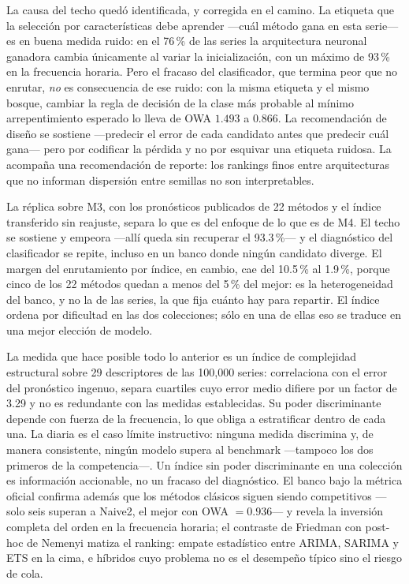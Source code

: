 La causa del techo quedó identificada, y corregida en el camino. La etiqueta que la
selección por características debe aprender ---cuál método gana en esta serie--- es en
buena medida ruido: en el 76\,\% de las series la arquitectura neuronal ganadora cambia
únicamente al variar la inicialización, con un máximo de 93\,\% en la frecuencia horaria.
Pero el fracaso del clasificador, que termina peor que no enrutar, \emph{no} es
consecuencia de ese ruido: con la misma etiqueta y el mismo bosque, cambiar la regla de
decisión de la clase más probable al mínimo arrepentimiento esperado lo lleva de OWA
$1.493$ a $0.866$. La recomendación de diseño se sostiene ---predecir el error de cada
candidato antes que predecir cuál gana--- pero por codificar la pérdida y no por esquivar
una etiqueta ruidosa. La acompaña una recomendación de reporte: los rankings finos entre
arquitecturas que no informan dispersión entre semillas no son interpretables.

La réplica sobre M3, con los pronósticos publicados de 22 métodos y el índice transferido
sin reajuste, separa lo que es del enfoque de lo que es de M4. El techo se sostiene y
empeora ---allí queda sin recuperar el 93.3\,\%--- y el diagnóstico del clasificador se
repite, incluso en un banco donde ningún candidato diverge. El margen del enrutamiento por
índice, en cambio, cae del 10.5\,\% al 1.9\,\%, porque cinco de los 22 métodos quedan a
menos del 5\,\% del mejor: es la heterogeneidad del banco, y no la de las series, la que
fija cuánto hay para repartir. El índice ordena por dificultad en las dos colecciones; sólo
en una de ellas eso se traduce en una mejor elección de modelo.

La medida que hace posible todo lo anterior es un índice de complejidad estructural sobre
29 descriptores de las 100{,}000 series: correlaciona con el error del pronóstico ingenuo,
separa cuartiles cuyo error medio difiere por un factor de 3.29 y no es redundante con las
medidas establecidas. Su poder discriminante depende con fuerza de la frecuencia, lo que
obliga a estratificar dentro de cada una. La diaria es el caso límite instructivo: ninguna
medida discrimina y, de manera consistente, ningún modelo supera al benchmark ---tampoco
los dos primeros de la competencia---. Un índice sin poder discriminante en una colección
es información accionable, no un fracaso del diagnóstico. El banco bajo la métrica oficial
confirma además que los métodos clásicos siguen siendo competitivos ---solo seis superan a
Naive2, el mejor con OWA $=0.936$--- y revela la inversión completa del orden en la
frecuencia horaria; el contraste de Friedman con post-hoc de Nemenyi matiza el ranking:
empate estadístico entre ARIMA, SARIMA y ETS en la cima, e híbridos cuyo problema no es el
desempeño típico sino el riesgo de cola.

